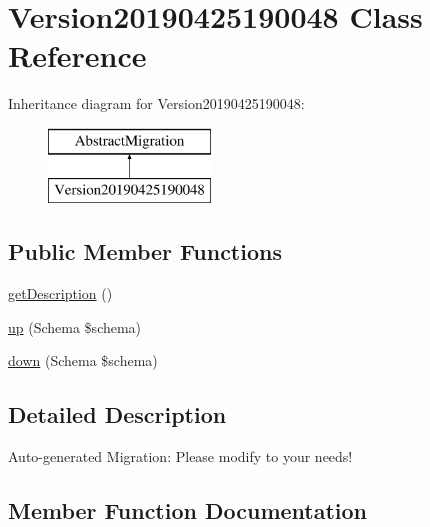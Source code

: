 \hypertarget{class_doctrine_migrations_1_1_version20190425190048}{}\section{Version20190425190048 Class Reference}
\label{class_doctrine_migrations_1_1_version20190425190048}
Inheritance diagram for Version20190425190048\+:\begin{figure}[H]
\begin{center}
\leavevmode
\includegraphics[height=2.000000cm]{class_doctrine_migrations_1_1_version20190425190048}
\end{center}
\end{figure}
\subsection*{Public Member Functions}
\begin{DoxyCompactItemize}
\item 
\mbox{\hyperlink{class_doctrine_migrations_1_1_version20190425190048_a2e7bb35c71bf1824456ceb944cb7a845}{get\+Description}} ()
\item 
\mbox{\hyperlink{class_doctrine_migrations_1_1_version20190425190048_a23eb1c1428e8ea2ab2cf798fc06ec421}{up}} (Schema \$schema)
\item 
\mbox{\hyperlink{class_doctrine_migrations_1_1_version20190425190048_aa8eb70255a46429d4d6165c778c9e5b9}{down}} (Schema \$schema)
\end{DoxyCompactItemize}


\subsection{Detailed Description}
Auto-\/generated Migration\+: Please modify to your needs! 

\subsection{Member Function Documentation}
\mbox{\label{class_doctrine_migrations_1_1_version20190425190048_aa8eb70255a46429d4d6165c778c9e5b9}} 
